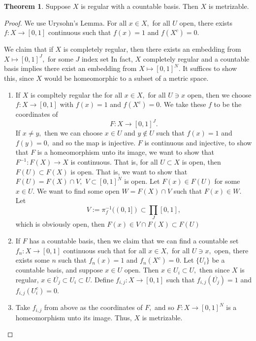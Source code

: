 \documentclass[10pt, oneside]{article}
\theoremstyle{definition}
\newtheorem{thm}{Theorem}
\begin{document}
\begin{thm}
    Suppose $X$ is regular with a countable basis. Then $X$ is metrizable.
\end{thm}
\begin{proof}
    We use Urysohn's Lemma. For all $x\in X,$ for all $U$ open, there exists $f: X\to [0,1]$ continuous such that $f(x) = 1$ and $f(X^c) = 0.$

    We claim that if $X$ is completely regular, then there exists an embedding from $X\mapsto [0,1]^J,$ for some $J$ index set In fact, $X$ completely regular and a countable basis implies there exist an embedding from $X\mapsto [0,1]^N.$ It suffices to show this, since $X$ would be homeomorphic to a subset of a metric space.

    \begin{enumerate}
        \item If $X$ is compltely regular the for all $x\in X,$ for all $U \ni x$ open, then we choose $f: X \to [0,1]$ with $f(x) = 1$ and $f(X^c) = 0.$ We take these $f$ to be the coordinates of 
        \[F: X \to [0,1]^J.\] If $x\neq y,$ then we can choose $x\in U$ and $y\notin U$ such that $f(x) = 1$ and $f(y)  = 0,$ and so the map is injective. $F$ is continuous and injective, to show that $F$ is a homeomorphism unto its image, we want to show that $F^{-1}: F(X) \to X$ is continuous. That is, for all $U \subset X$ is open, then $F(U)\subset F(X)$ is open. That is, we want to show that $F(U) = F(X) \cap V,$ $V\subset [0,1]^N$ is open. Let $F(x) \in F(U)$ for some $x\in U.$ We want to find some open $W = F(X) \cap V$ such that  $F(x) \in W.$ Let \[V := \pi_f^{-1}((0,1]) \subset \prod_J [0,1],\] which is obviously open, then $F(x)\in V\cap F(X)\subset F(U)$
        \item If $F$ has a countable basis, then we claim that we can find a countable set $f_n: X\to [0,1]$ continuous such that for all $x\in X,$ for all $U\ni x,$ open, there exists some $n$ such that $f_n(x) = 1$ and $f_n(X^c) = 0.$ Let $\{U_i\}$ be a countable basis, and suppose $x\in U$ open. Then $x\in U_i \subset U,$ then since $X$ is regular, $x \in \overline{U_j}\subset U_i \subset U.$ Define $f_{i,j}: X\to [0,1]$ such that $f_{i,j}(\overline{U_j}) = 1$ and $f_{i,j}(U_i^c) = 0.$
        \item Take $f_{i,j}$ from above as the coordinates of $F,$ and so $F: X\to [0,1]^N$ is a homeomorphism unto its image. Thus, $X$ is metrizable.  
    \end{enumerate}
\end{proof}
\end{document}
